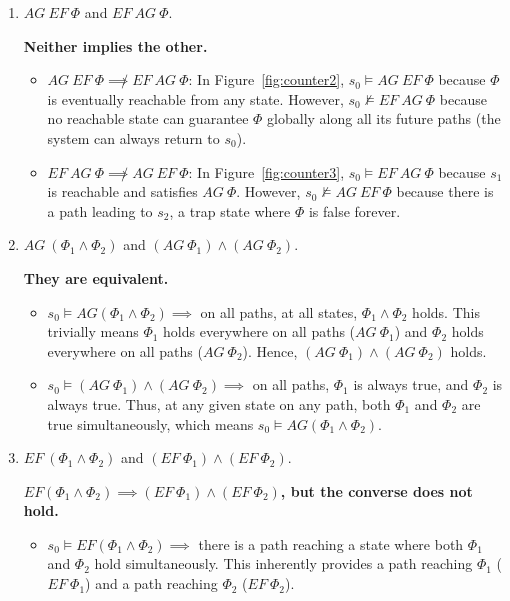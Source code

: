 \documentclass[12pt,a4paper]{article}
\begin{document}
\begin{description}
\begin{enumerate}[label=\alph*)]
\begin{itemize}
\end{itemize}
\color{black}
\fi
%
\item $AG\ EF\ \Phi$ and $EF\ AG\ \Phi$.
%
\ifwithanswers
\color{blue}
\par\textbf{Neither implies the other.}
\begin{itemize}
    \item[$(\not\Rightarrow)$] $AG\ EF\ \Phi \not\implies EF\ AG\ \Phi$: In Figure~\ref{fig:counter2}, $s_0 \models AG\ EF\ \Phi$ because $\Phi$ is eventually reachable from any state. However, $s_0 \not\models EF\ AG\ \Phi$ because no reachable state can guarantee $\Phi$ globally along all its future paths (the system can always return to $s_0$).
    \item[$(\not\Leftarrow)$] $EF\ AG\ \Phi \not\implies AG\ EF\ \Phi$: In Figure~\ref{fig:counter3}, $s_0 \models EF\ AG\ \Phi$ because $s_1$ is reachable and satisfies $AG\ \Phi$. However, $s_0 \not\models AG\ EF\ \Phi$ because there is a path leading to $s_2$, a trap state where $\Phi$ is false forever.
\end{itemize}
\color{black}
\fi
%
\item $AG\ (\Phi_1 \land \Phi_2)$ and $(AG\ \Phi_1) \land (AG\ \Phi_2)$.
%
\ifwithanswers
\color{blue}
\par\textbf{They are equivalent.}
\begin{itemize}
    \item[$(\Rightarrow)$] $s_0 \models AG(\Phi_1 \land \Phi_2) \implies$ on all paths, at all states, $\Phi_1 \land \Phi_2$ holds. This trivially means $\Phi_1$ holds everywhere on all paths ($AG\ \Phi_1$) and $\Phi_2$ holds everywhere on all paths ($AG\ \Phi_2$). Hence, $(AG\ \Phi_1) \land (AG\ \Phi_2)$ holds.
    \item[$(\Leftarrow)$] $s_0 \models (AG\ \Phi_1) \land (AG\ \Phi_2) \implies$ on all paths, $\Phi_1$ is always true, and $\Phi_2$ is always true. Thus, at any given state on any path, both $\Phi_1$ and $\Phi_2$ are true simultaneously, which means $s_0 \models AG(\Phi_1 \land \Phi_2)$.
\end{itemize}
\color{black}
\fi
%
\item $EF\ (\Phi_1 \land \Phi_2)$ and $(EF\ \Phi_1) \land (EF\ \Phi_2)$.
%
\ifwithanswers
\color{blue}
\par\textbf{$EF(\Phi_1 \land \Phi_2) \implies (EF\ \Phi_1) \land (EF\ \Phi_2)$, but the converse does not hold.}
\begin{itemize}
    \item[$(\Rightarrow)$] $s_0 \models EF(\Phi_1 \land \Phi_2) \implies$ there is a path reaching a state where both $\Phi_1$ and $\Phi_2$ hold simultaneously. This inherently provides a path reaching $\Phi_1$ ($EF\ \Phi_1$) and a path reaching $\Phi_2$ ($EF\ \Phi_2$).

\end{itemize}
\end{enumerate}
\end{description}
\end{document}
